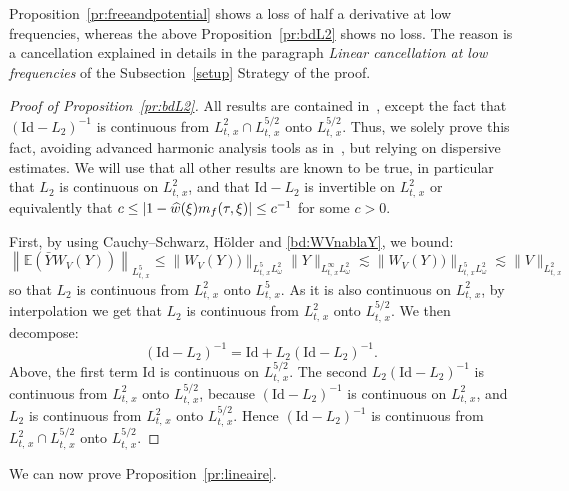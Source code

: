\documentclass[AHL, Unicode, longabstracts,published]{cedram}
\newcommand{\E}{\mathbb{E}}
\newcommand{\Id}{\mathrm{Id}}
\let\oldhat\hat
\renewcommand*{\hat}[1]{\mathchoice{\widehat{#1}}{\widehat{#1}}{\oldhat{#1}}{\oldhat{#1}}}
\begin{document}
\begin{rema}\label{rem:cancellationlineaire}
Proposition~\ref{pr:freeandpotential} shows a loss of half a derivative at low frequencies, whereas the above Proposition~\ref{pr:bdL2} shows no loss. The reason is a cancellation explained in details in the paragraph \emph{Linear cancellation at low frequencies} of the Subsection~\ref{setup} Strategy of the proof.
\end{rema}


\begin{proof}[Proof of Proposition~\ref{pr:bdL2}]
All results are contained in~\cite[Proposition~1 and Corollary~1]{lewsab2}, except the fact that $(\Id-L_2)^{-1}$ is continuous from $L^2_{t,\,x}\cap L^{5/2}_{t,\,x}$ onto $L^{5/2}_{t,\,x}$. Thus, we solely prove this fact, avoiding advanced harmonic analysis tools as in~\cite{lewsab2}, but relying on dispersive estimates. We will use that all other results are known to be true, in particular that $L_2$ is continuous on $L^2_{t,\,x}$, and that $\Id-L_2$ is invertible on $L^2_{t,\,x}$ or equivalently that $c\leq |1-\hat w(\xi)m_f(\tau,\xi)|\leq c^{-1}$ for some $c>0$.

First, by using Cauchy--Schwarz, H\"older and \eqref{bd:WVnablaY}, we bound:
\[
\left\| \E \left(\bar Y W_V (Y)\right) \right\|_{L^5_{t,\,x}}\leq \| W_V (Y)) \|_{L^5_{t,\,x}L^2_\omega} \| Y \|_{L^{\infty}_{t,\,x}L^2_\omega}\lesssim \| W_V (Y)) \|_{L^5_{t,\,x}L^2_\omega} \lesssim \| V \|_{L^2_{t,\,x}}
\]
so that $L_2$ is continuous from $L^2_{t,\,x}$ onto $L^{5}_{t,\,x}$. As it is also continuous on $L^2_{t,\,x}$, by interpolation we get that $L_2$ is continuous from $L^2_{t,\,x}$ onto $L^{5/2}_{t,\,x}$. We then decompose:
\[
(\Id-L_2)^{-1}=\Id+L_2(\Id-L_2)^{-1}.
\]
Above, the first term $\Id$ is continuous on $L^{5/2}_{t,\,x}$. The second $L_2(\Id-L_2)^{-1}$ is continuous from $L^2_{t,\,x}$ onto $L^{5/2}_{t,\,x}$, because $(\Id-L_2)^{-1}$ is continuous on $L^2_{t,\,x}$, and $L_2$ is continuous from $L^2_{t,\,x}$ onto $L^{5/2}_{t,\,x}$. Hence $(\Id-L_2)^{-1}$ is continuous from $L^2_{t,\,x}\cap L^{5/2}_{t,\,x}$ onto $L^{5/2}_{t,\,x}$.
\end{proof}


We can now prove Proposition~\ref{pr:lineaire}.
\end{document}
